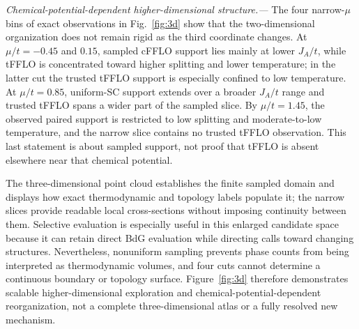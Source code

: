 \textit{Chemical-potential-dependent higher-dimensional structure.---}
The four narrow-$\mu$ bins of exact observations in Fig.~\ref{fig:3d} show that the two-dimensional organization does not remain rigid as the third coordinate changes.  At $\mu/t=-0.45$ and $0.15$, sampled cFFLO support lies mainly at lower $J_A/t$, while tFFLO is concentrated toward higher splitting and lower temperature; in the latter cut the trusted tFFLO support is especially confined to low temperature.  At $\mu/t=0.85$, uniform-SC support extends over a broader $J_A/t$ range and trusted tFFLO spans a wider part of the sampled slice.  By $\mu/t=1.45$, the observed paired support is restricted to low splitting and moderate-to-low temperature, and the narrow slice contains no trusted tFFLO observation.  This last statement is about sampled support, not proof that tFFLO is absent elsewhere near that chemical potential.



The three-dimensional point cloud establishes the finite sampled domain and displays how exact thermodynamic and topology labels populate it; the narrow slices provide readable local cross-sections without imposing continuity between them.  Selective evaluation is especially useful in this enlarged candidate space because it can retain direct BdG evaluation while directing calls toward changing structures.  Nevertheless, nonuniform sampling prevents phase counts from being interpreted as thermodynamic volumes, and four cuts cannot determine a continuous boundary or topology surface.  Figure~\ref{fig:3d} therefore demonstrates scalable higher-dimensional exploration and chemical-potential-dependent reorganization, not a complete three-dimensional atlas or a fully resolved new mechanism.
